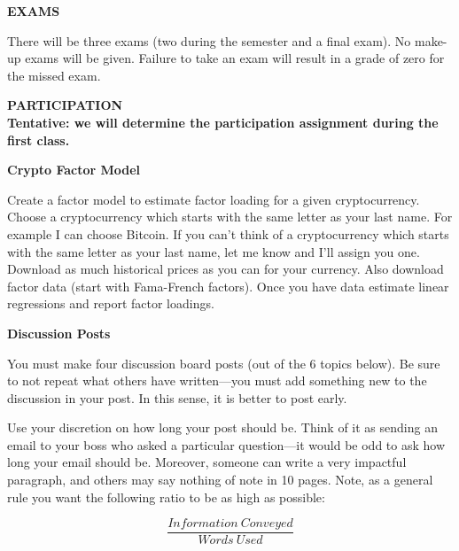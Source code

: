 \documentclass{article}
\begin{document}
\begin{center}
{\bf EXAMS} 
\end{center}
There will be three exams (two during the semester and a final exam). No make-up exams will be given.  Failure to take an exam will result in a grade of zero for the missed exam.  
\begin{center}
  {\bf PARTICIPATION}\\
    {\bf Tentative: we will determine the participation assignment during the first class.}
\end{center}
\begin{center}
  {\bf Crypto Factor Model}\\
\end{center}
Create a factor model to estimate factor loading for a given cryptocurrency.  Choose a cryptocurrency which starts with the same letter as your last name.  For example I can choose Bitcoin.  If you can't think of a cryptocurrency which starts with the same letter as your last name, let me know and I'll assign you one.  Download as much historical prices as you can for your currency.  Also download factor data (start with Fama-French factors).  Once you have data estimate linear regressions and report factor loadings.
\begin{center}
  {\bf Discussion Posts}\\
\end{center}
You must make four discussion board posts (out of the 6 topics below).  Be sure to not repeat what others have written---you must add something new to the discussion in your post.  In this sense, it is better to post early.

Use your discretion on how long your post should be. Think of it as sending an email to your boss who asked a particular question---it would be odd to ask how long your email should be.  Moreover, someone can write a very impactful paragraph, and others may say nothing of note in 10 pages. Note, as a general rule you want the following ratio to be as high as possible:

$$\frac{Information\ Conveyed}{Words\ Used}$$
\end{document}

